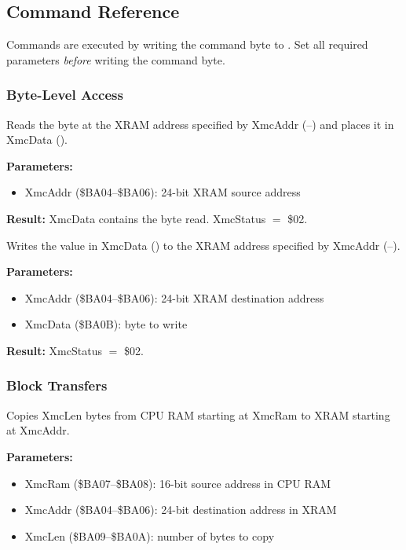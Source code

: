 \subsection{Command Reference}
\label{sec:xmc-commands}

Commands are executed by writing the command byte to .  Set all
required parameters \emph{before} writing the command byte.

\subsubsection{Byte-Level Access}


Reads the byte at the XRAM address specified by XmcAddr
(--) and places it in XmcData ().

\textbf{Parameters:}
\begin{itemize}
  \item XmcAddr (\$BA04--\$BA06): 24-bit XRAM source address
\end{itemize}

\textbf{Result:} XmcData contains the byte read.  XmcStatus $=$ \$02.

\medskip


Writes the value in XmcData () to the XRAM address specified
by XmcAddr (--).

\textbf{Parameters:}
\begin{itemize}
  \item XmcAddr (\$BA04--\$BA06): 24-bit XRAM destination address
  \item XmcData (\$BA0B): byte to write
\end{itemize}

\textbf{Result:} XmcStatus $=$ \$02.

\subsubsection{Block Transfers}


Copies XmcLen bytes from CPU RAM starting at XmcRam to XRAM starting at
XmcAddr.

\textbf{Parameters:}
\begin{itemize}
  \item XmcRam (\$BA07--\$BA08): 16-bit source address in CPU RAM
  \item XmcAddr (\$BA04--\$BA06): 24-bit destination address in XRAM
  \item XmcLen (\$BA09--\$BA0A): number of bytes to copy
\end{itemize}

